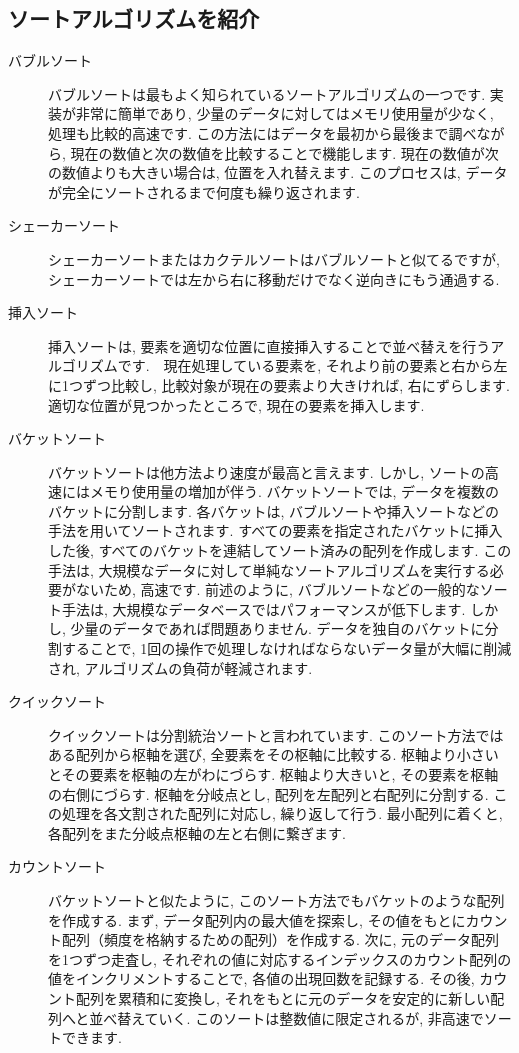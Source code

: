 \documentclass[a4j, 12pt]{jarticle}
\begin{document}
\subsection{ソートアルゴリズムを紹介}
\begin{description}
  \item[バブルソート] バブルソートは最もよく知られているソートアルゴリズムの一つです. 実装が非常に簡単であり, 少量のデータに対してはメモリ使用量が少なく, 処理も比較的高速です. この方法にはデータを最初から最後まで調べながら, 現在の数値と次の数値を比較することで機能します. 現在の数値が次の数値よりも大きい場合は, 位置を入れ替えます. このプロセスは, データが完全にソートされるまで何度も繰り返されます.\\
  \item[シェーカーソート] シェーカーソートまたはカクテルソートはバブルソートと似てるですが, シェーカーソートでは左から右に移動だけでなく逆向きにもう通過する. \\
  \item[挿入ソート] 挿入ソートは, 要素を適切な位置に直接挿入することで並べ替えを行うアルゴリズムです.　現在処理している要素を, それより前の要素と右から左に1つずつ比較し, 比較対象が現在の要素より大きければ, 右にずらします.　適切な位置が見つかったところで, 現在の要素を挿入します. \\
  \item[バケットソート] バケットソートは他方法より速度が最高と言えます. しかし, ソートの高速にはメモり使用量の増加が伴う. バケットソートでは, データを複数のバケットに分割します. 各バケットは, バブルソートや挿入ソートなどの手法を用いてソートされます. すべての要素を指定されたバケットに挿入した後, すべてのバケットを連結してソート済みの配列を作成します. この手法は, 大規模なデータに対して単純なソートアルゴリズムを実行する必要がないため, 高速です. 前述のように, バブルソートなどの一般的なソート手法は, 大規模なデータベースではパフォーマンスが低下します. しかし, 少量のデータであれば問題ありません. データを独自のバケットに分割することで, 1回の操作で処理しなければならないデータ量が大幅に削減され, アルゴリズムの負荷が軽減されます. \\
  \item[クイックソート] クイックソートは分割統治ソートと言われています. このソート方法ではある配列から枢軸を選び, 全要素をその枢軸に比較する. 枢軸より小さいとその要素を枢軸の左がわにづらす. 枢軸より大きいと, その要素を枢軸の右側にづらす. 枢軸を分岐点とし, 配列を左配列と右配列に分割する. この処理を各文割された配列に対応し, 繰り返して行う. 最小配列に着くと, 各配列をまた分岐点枢軸の左と右側に繋ぎます. \\
  \item[カウントソート] バケットソートと似たように, このソート方法でもバケットのような配列を作成する. まず, データ配列内の最大値を探索し, その値をもとにカウント配列（頻度を格納するための配列）を作成する. 次に, 元のデータ配列を1つずつ走査し, それぞれの値に対応するインデックスのカウント配列の値をインクリメントすることで, 各値の出現回数を記録する. その後, カウント配列を累積和に変換し, それをもとに元のデータを安定的に新しい配列へと並べ替えていく. このソートは整数値に限定されるが, 非高速でソートできます. \\
\end{description}
\end{document}

